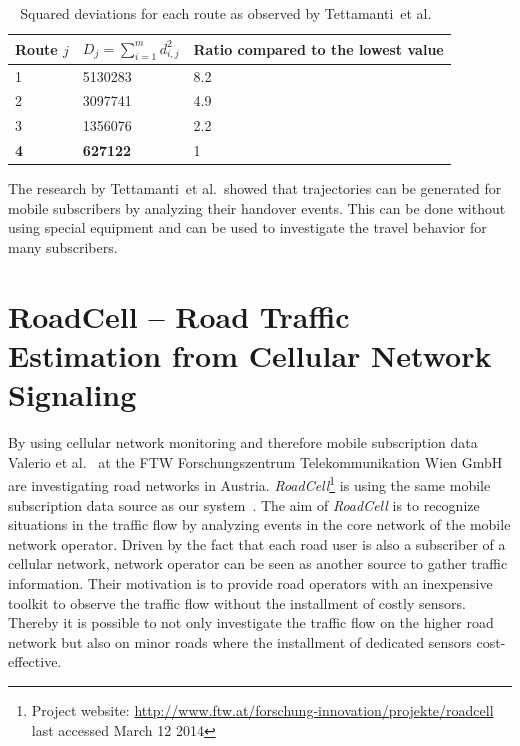 \begin{table}[h]

\begin{tabular}{l|ll}
\hline
Route $j$                   &  $D_j=\sum_{i=1}^{m} d_{i,j}^{2}$ & Ratio compared to
the lowest value  \\ \hline
1&5130283&8.2 \\
2&3097741&4.9 \\
3&1356076&2.2 \\
\textbf{4}  &\textbf{627122} &1 \\ \hline
\end{tabular}
\caption{Squared deviations for each route as observed by Tettamanti~et al.\ \cite{Tettamanti2012}}
\label{tab:tetta}
\end{table}

The research by Tettamanti~et al.\ showed that trajectories can be generated for mobile subscribers by analyzing their handover events. This can be done without using special equipment and can be used to investigate the travel behavior for many subscribers.

\section{RoadCell -- Road Traffic Estimation from Cellular Network Signaling}
By using cellular network monitoring and therefore mobile subscription data Valerio et al.\ \cite{Valerio2009,Valerio20092} at the FTW Forschungszentrum Telekommunikation Wien GmbH are investigating road networks in Austria. \emph{RoadCell}\footnote{Project website: \url{http://www.ftw.at/forschung-innovation/projekte/roadcell} last accessed March 12 2014} is using the same mobile subscription data source as our system~\cite{RoadCell2009}. The aim of \emph{RoadCell} is to recognize situations in the traffic flow by analyzing events in the core network of the mobile network operator. Driven by the fact that each road user is also a subscriber of a cellular network, network operator can be seen as another source to gather traffic information. Their motivation is to provide road operators with an inexpensive toolkit to observe the traffic flow without the installment of costly sensors. Thereby it is possible to not only investigate the traffic flow on the higher road network but also on minor roads where the installment of dedicated sensors cost-effective.

